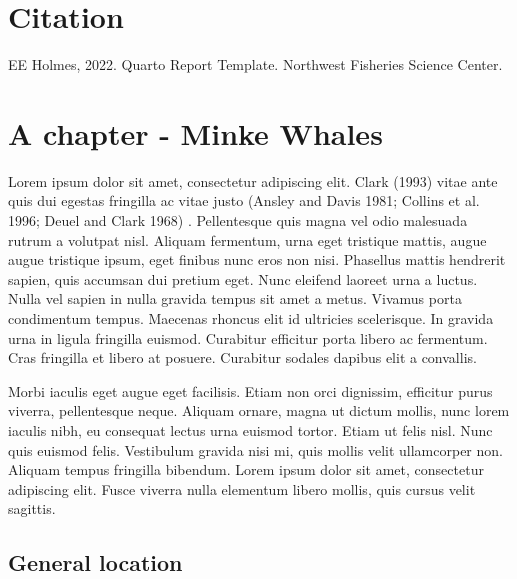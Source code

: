 \documentclass[
  letterpaper,
  oneside,
  open=any]{scrbook}
\renewcommand*\contentsname{Table of contents}
\newcommand\contentsname{Table of contents}
\begin{document}
\renewcommand*\contentsname{Table of contents}
{
\setcounter{tocdepth}{1}
\tableofcontents
}
\listoffigures
\listoftables
\mainmatter
{}

\hypertarget{citation}{%
\chapter*{Citation}\label{citation}}


EE Holmes, 2022. Quarto Report Template. Northwest Fisheries Science
Center.


\hypertarget{a-chapter---minke-whales}{%
\chapter{A chapter - Minke Whales}\label{a-chapter---minke-whales}}

Lorem ipsum dolor sit amet, consectetur adipiscing elit. Clark (1993)
vitae ante quis dui egestas fringilla ac vitae justo (Ansley and Davis
1981; Collins et al. 1996; Deuel and Clark 1968) . Pellentesque quis
magna vel odio malesuada rutrum a volutpat nisl. Aliquam fermentum, urna
eget tristique mattis, augue augue tristique ipsum, eget finibus nunc
eros non nisi. Phasellus mattis hendrerit sapien, quis accumsan dui
pretium eget. Nunc eleifend laoreet urna a luctus. Nulla vel sapien in
nulla gravida tempus sit amet a metus. Vivamus porta condimentum tempus.
Maecenas rhoncus elit id ultricies scelerisque. In gravida urna in
ligula fringilla euismod. Curabitur efficitur porta libero ac fermentum.
Cras fringilla et libero at posuere. Curabitur sodales dapibus elit a
convallis.

Morbi iaculis eget augue eget facilisis. Etiam non orci dignissim,
efficitur purus viverra, pellentesque neque. Aliquam ornare, magna ut
dictum mollis, nunc lorem iaculis nibh, eu consequat lectus urna euismod
tortor. Etiam ut felis nisl. Nunc quis euismod felis. Vestibulum gravida
nisi mi, quis mollis velit ullamcorper non. Aliquam tempus fringilla
bibendum. Lorem ipsum dolor sit amet, consectetur adipiscing elit. Fusce
viverra nulla elementum libero mollis, quis cursus velit sagittis.

\hypertarget{general-location}{%
\section{General location}\label{general-location}}
\end{document}
